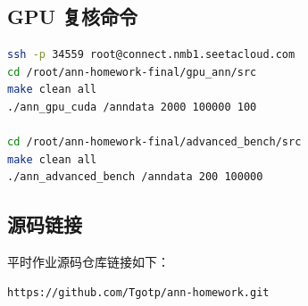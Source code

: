 \documentclass[UTF8,a4paper,10pt]{ctexart}
\begin{document}
\subsection{GPU 复核命令}

\begin{lstlisting}[language=bash]
ssh -p 34559 root@connect.nmb1.seetacloud.com
cd /root/ann-homework-final/gpu_ann/src
make clean all
./ann_gpu_cuda /anndata 2000 100000 100

cd /root/ann-homework-final/advanced_bench/src
make clean all
./ann_advanced_bench /anndata 200 100000
\end{lstlisting}

\subsection{源码链接}

平时作业源码仓库链接如下：

\begin{lstlisting}
https://github.com/Tgotp/ann-homework.git
\end{lstlisting}
\end{document}
